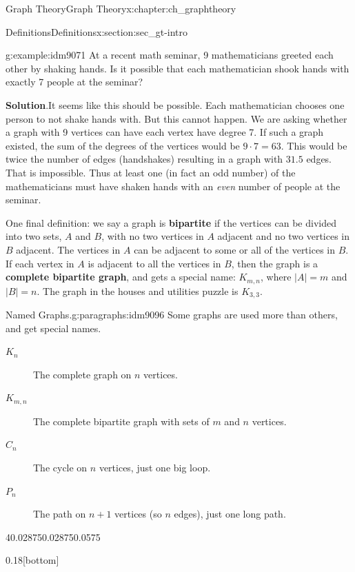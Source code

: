 \documentclass[oneside,10pt,]{book}
\newcommand{\terminology}[1]{\textbf{#1}}
\numberwithin{equation}{chapter}
\begin{document}
\begin{chapterptx}{Graph Theory}{}{Graph Theory}{}{}{x:chapter:ch_graphtheory}
\begin{sectionptx}{Definitions}{}{Definitions}{}{}{x:section:sec_gt-intro}
\begin{example}{}{g:example:idm9071}%
At a recent math seminar, 9 mathematicians greeted each other by shaking hands. Is it possible that each mathematician shook hands with exactly 7 people at the seminar?%
\par\smallskip%
\noindent\textbf{Solution}.\hypertarget{g:solution:idm9074}{}\quad{}It seems like this should be possible. Each mathematician chooses one person to not shake hands with. But this cannot happen. We are asking whether a graph with 9 vertices can have each vertex have degree 7. If such a graph existed, the sum of the degrees of the vertices would be \(9\cdot 7 = 63\). This would be twice the number of edges (handshakes) resulting in a graph with \(31.5\) edges. That is impossible. Thus at least one (in fact an odd number) of the mathematicians must have shaken hands with an \emph{even} number of people at the seminar.%
\end{example}
One final definition: we say a graph is \terminology{bipartite} if the vertices can be divided into two sets, \(A\) and \(B\), with no two vertices in \(A\) adjacent and no two vertices in \(B\) adjacent. The vertices in \(A\) can be adjacent to some or all of the vertices in \(B\). If each vertex in \(A\) is adjacent to all the vertices in \(B\), then the graph is a \terminology{complete bipartite graph}, and gets a special name: \(K_{m,n}\), where \(|A| = m\) and \(|B| = n\). The graph in the houses and utilities puzzle is \(K_{3,3}\).%
\begin{paragraphs}{Named Graphs.}{g:paragraphs:idm9096}%
Some graphs are used more than others, and get special names.%
\begin{description}
\item[{\(K_n\)}]The complete graph on \(n\) vertices.\label{g:notation:idm9105}%
\item[{\(K_{m,n}\)}]The complete bipartite graph with sets of \(m\) and \(n\) vertices. \label{g:notation:idm9115}%
\item[{\(C_n\)}]The cycle on \(n\) vertices, just one big loop. \label{g:notation:idm9125}%
\item[{\(P_n\)}]The path on \(n+1\) vertices (so \(n\) edges), just one long path. \label{g:notation:idm9135}%
\end{description}
%
\begin{sidebyside}{4}{0.02875}{0.02875}{0.0575}%
\begin{sbspanel}{0.18}[bottom]%
\resizebox{\linewidth}{!}{%
				\begin{tikzpicture}[scale=1]

\end{tikzpicture}}
\end{sbspanel}
\end{sidebyside}
\end{paragraphs}
\end{sectionptx}
\end{chapterptx}
\end{document}
